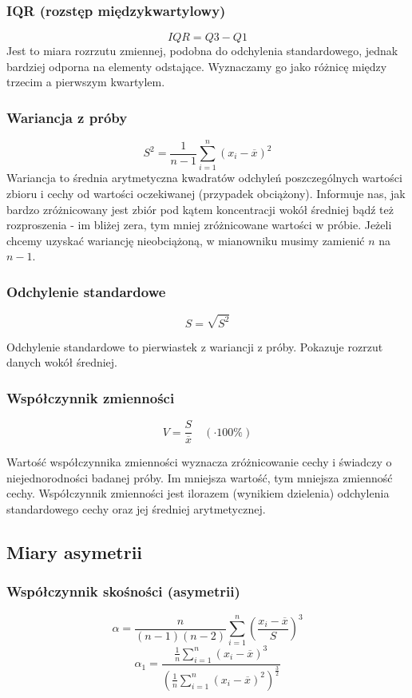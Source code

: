 \documentclass{article}
\theoremstyle{break}
\begin{document}
\subsubsection{IQR (rozstęp międzykwartylowy)}
$$IQR=Q3-Q1$$
 Jest to miara rozrzutu zmiennej, podobna do odchylenia standardowego, jednak bardziej odporna na elementy odstające. Wyznaczamy go jako różnicę między trzecim a pierwszym kwartylem.
\subsubsection{Wariancja z próby}
$$S^2=\frac{1}{n-1}\sum\limits_{i=1}^{n}(x_i - \overline{x})^2$$
Wariancja to średnia arytmetyczna kwadratów odchyleń poszczególnych wartości zbioru i cechy od wartości oczekiwanej (przypadek obciążony).  Informuje nas, jak bardzo zróżnicowany jest zbiór pod kątem koncentracji wokół średniej bądź też rozproszenia - im bliżej zera, tym mniej zróżnicowane wartości w próbie. Jeżeli chcemy uzyskać wariancję nieobciążoną, w mianowniku musimy zamienić $n$ na $n-1$.
\subsubsection{Odchylenie standardowe}

$$S=\sqrt{S^2}$$

Odchylenie standardowe to pierwiastek z wariancji z próby. Pokazuje rozrzut danych wokół średniej.

\subsubsection{Współczynnik zmienności}
$$V=\frac{S}{\overline{x}} \quad (\cdot 100\%)$$

Wartość współczynnika zmienności wyznacza zróżnicowanie cechy i świadczy o niejednorodności badanej próby. Im mniejsza wartość, tym mniejsza zmienność cechy. Współczynnik zmienności jest ilorazem (wynikiem dzielenia) odchylenia standardowego cechy oraz jej średniej arytmetycznej.

\subsection{Miary asymetrii}
\subsubsection{Współczynnik skośności (asymetrii)}

$$\alpha =\frac{n}{(n-1)(n-2)}\sum\limits_{i=1}^{n}(\frac{x_i-\overline{x}}{S})^3$$
$$\alpha_1 =\frac{\frac{1}{n}\sum\limits_{i=1}^{n}(x_i-\overline{x})^3}{(\frac{1}{n}\sum\limits_{i=1}^{n}(x_i-\overline{x})^2)^{\frac{3}{2}}}$$
\end{document}
